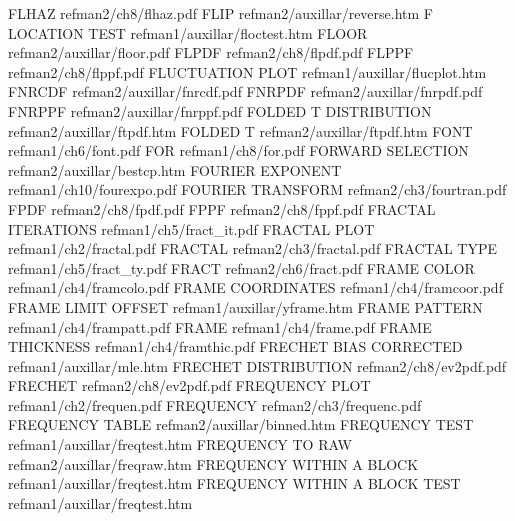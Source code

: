 FLHAZ                                   refman2/ch8/flhaz.pdf
FLIP                                    refman2/auxillar/reverse.htm
F LOCATION TEST                         refman1/auxillar/floctest.htm
FLOOR                                   refman2/auxillar/floor.pdf
FLPDF                                   refman2/ch8/flpdf.pdf
FLPPF                                   refman2/ch8/flppf.pdf
FLUCTUATION PLOT                        refman1/auxillar/flucplot.htm
FNRCDF                                  refman2/auxillar/fnrcdf.pdf
FNRPDF                                  refman2/auxillar/fnrpdf.pdf
FNRPPF                                  refman2/auxillar/fnrppf.pdf
FOLDED T DISTRIBUTION                   refman2/auxillar/ftpdf.htm
FOLDED T                                refman2/auxillar/ftpdf.htm
FONT                                    refman1/ch6/font.pdf
FOR                                     refman1/ch8/for.pdf
FORWARD SELECTION                       refman2/auxillar/bestcp.htm
FOURIER EXPONENT                        refman1/ch10/fourexpo.pdf
FOURIER TRANSFORM                       refman2/ch3/fourtran.pdf
FPDF                                    refman2/ch8/fpdf.pdf
FPPF                                    refman2/ch8/fppf.pdf
FRACTAL ITERATIONS                      refman1/ch5/fract_it.pdf
FRACTAL PLOT                            refman1/ch2/fractal.pdf
FRACTAL                                 refman2/ch3/fractal.pdf
FRACTAL TYPE                            refman1/ch5/fract_ty.pdf
FRACT                                   refman2/ch6/fract.pdf
FRAME COLOR                             refman1/ch4/framcolo.pdf
FRAME COORDINATES                       refman1/ch4/framcoor.pdf
FRAME LIMIT OFFSET                      refman1/auxillar/yframe.htm
FRAME PATTERN                           refman1/ch4/frampatt.pdf
FRAME                                   refman1/ch4/frame.pdf
FRAME THICKNESS                         refman1/ch4/framthic.pdf
FRECHET BIAS CORRECTED                  refman1/auxillar/mle.htm
FRECHET DISTRIBUTION                    refman2/ch8/ev2pdf.pdf
FRECHET                                 refman2/ch8/ev2pdf.pdf
FREQUENCY PLOT                          refman1/ch2/frequen.pdf
FREQUENCY                               refman2/ch3/frequenc.pdf
FREQUENCY TABLE                         refman2/auxillar/binned.htm
FREQUENCY TEST                          refman1/auxillar/freqtest.htm
FREQUENCY TO RAW                        refman2/auxillar/freqraw.htm
FREQUENCY WITHIN A BLOCK                refman1/auxillar/freqtest.htm
FREQUENCY WITHIN A BLOCK TEST           refman1/auxillar/freqtest.htm
